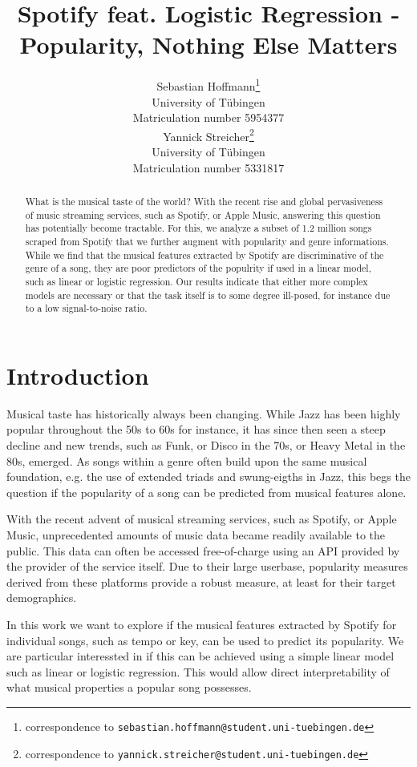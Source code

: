 \documentclass{article}
\title{Spotify feat. Logistic Regression - \\ Popularity, Nothing Else Matters}
\author{%
  Sebastian Hoffmann\thanks{correspondence to \texttt{sebastian.hoffmann@student.uni-tuebingen.de}}\\
  University of Tübingen\\
  Matriculation number 5954377\\
  \And
  Yannick Streicher\thanks{correspondence to \texttt{yannick.streicher@student.uni-tuebingen.de}}\\
  University of Tübingen\\
  Matriculation number 5331817\\
}
\begin{document}
\maketitle

\begin{abstract}
  What is the musical taste of the world? With the recent rise and global pervasiveness of music streaming services, such as Spotify, or Apple Music, answering this question has potentially become tractable. For this, we analyze a subset of 1.2 million songs scraped from Spotify that we further augment with popularity and genre informations. While we find that the musical features extracted by Spotify are discriminative of the genre of a song, they are poor predictors of the populrity if used in a linear model, such as linear or logistic regression. Our results indicate that either more complex models are necessary or that the task itself is to some degree ill-posed, for instance due to a low signal-to-noise ratio.
\end{abstract}

\section{Introduction}

Musical taste has historically always been changing. While Jazz has been highly popular throughout the 50s to 60s for instance, it has since then seen a steep decline and new trends, such as Funk, or Disco in the 70s, or Heavy Metal in the 80s, emerged. As songs within a genre often build upon the same musical foundation, e.g. the use of extended triads and swung-eigths in Jazz, this begs the question if the popularity of a song can be predicted from musical features alone.

With the recent advent of musical streaming services, such as Spotify, or Apple Music, unprecedented amounts of music data became readily available to the public. This data can often be accessed free-of-charge using an API provided by the provider of the service itself. Due to their large userbase, popularity measures derived from these platforms provide a robust measure, at least for their target demographics.

In this work we want to explore if the musical features extracted by Spotify for individual songs, such as tempo or key, can be used to predict  its popularity. We are particular interessted in if this can be achieved using a simple linear model such as linear or logistic regression. This would allow direct interpretability of what musical properties a popular song possesses.
\end{document}
